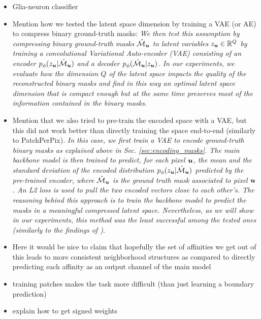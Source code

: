 \begin{itemize}
\item Glia-neuron classifier
\item Mention how we tested the latent space dimension by training a VAE (or AE) to compress binary ground-truth \maskname masks: \emph{We then test this assumption by compressing binary ground-truth \maskname masks $\hat{\mathcal{M}}_{\bm{u}}$ to latent variables $z_{\bm{u}}\in \mathbb{R}^Q$ by training a convolutional Variational Auto-encoder (VAE) \cite{kingma2013auto,rezende2014stochastic} consisting of an encoder $p_{\phi}(z_{\bm{u}}|\hat{\mathcal{M}}_{\bm{u}})$ and a decoder $p_{\phi}(\hat{\mathcal{M}}_{\bm{u}}|z_{\bm{u}})$.
In our experiments, we evaluate how the dimension $Q$ of the latent space impacts the quality of the reconstructed binary masks and find in this way an optimal latent space dimension that is compact enough but at the same time preserves most of the information contained in the binary masks.}
\item Mention that we also tried to pre-train the encoded space with a VAE, but this did not work better than directly training the space end-to-end (similarly to PatchPerPix). 
\emph{In this case, we first train a VAE to encode ground-truth binary masks as explained above in Sec. \ref{sec:encoding_masks}. 
The main backbone model is then trained to predict, for each pixel $\bm{u}$, the mean and the standard deviation of the encoded distribution $p_{\phi}(z_{\bm{u}}|\hat{\mathcal{M}}_{\bm{u}})$ predicted by the pre-trained encoder, where $\hat{\mathcal{M}}_{\bm{u}}$ is the ground truth \maskname mask associated to pixel $\bm{u}$. An L2 loss is used to pull the two encoded vectors close to each other's. 
The reasoning behind this approach is to train the backbone model to predict the masks in a meaningful compressed latent space. 
Nevertheless, as we will show in our experiments, this method was the least successful among the tested ones (\emph{similarly to the findings of \cite{hirsch2020patchperpix}}).}
\item Here it would be nice to claim that hopefully the set of affinities we get out of this leads to more consistent neighborhood structures as compared to directly predicting each affinity as an output channel of the main model
\item training patches makes the task more difficult (than just learning a boundary prediction)
\item explain how to get signed weights

\end{itemize}


